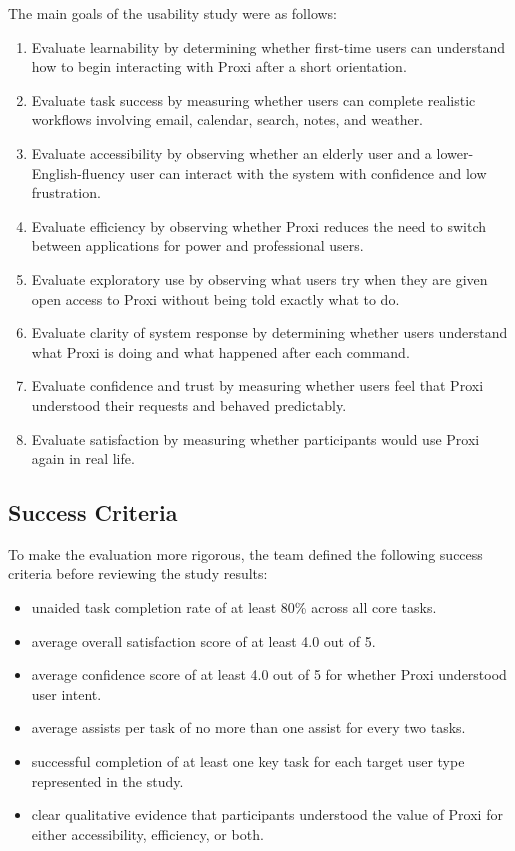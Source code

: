 \documentclass[12pt, titlepage]{article}
\begin{document}
The main goals of the usability study were as follows:
\begin{enumerate}[label=\arabic*.]
    \item Evaluate learnability by determining whether first-time users
    can understand how to begin interacting with Proxi after a short
    orientation.
    \item Evaluate task success by measuring whether users can complete
    realistic workflows involving email, calendar, search, notes, and
    weather.
    \item Evaluate accessibility by observing whether an elderly user
    and a lower-English-fluency user can interact with the system with
    confidence and low frustration.
    \item Evaluate efficiency by observing whether Proxi reduces the
    need to switch between applications for power and professional
    users.
    \item Evaluate exploratory use by observing what users try when they
    are given open access to Proxi without being told exactly what to
    do.
    \item Evaluate clarity of system response by determining whether
    users understand what Proxi is doing and what happened after each
    command.
    \item Evaluate confidence and trust by measuring whether users feel
    that Proxi understood their requests and behaved predictably.
    \item Evaluate satisfaction by measuring whether participants would
    use Proxi again in real life.
\end{enumerate}

\subsection{Success Criteria}

To make the evaluation more rigorous, the team defined the following
success criteria before reviewing the study results:

\begin{itemize}
    \item unaided task completion rate of at least 80\% across all core
    tasks.
    \item average overall satisfaction score of at least 4.0 out of 5.
    \item average confidence score of at least 4.0 out of 5 for whether
    Proxi understood user intent.
    \item average assists per task of no more than one assist for every
    two tasks.
    \item successful completion of at least one key task for each target
    user type represented in the study.
    \item clear qualitative evidence that participants understood the
    value of Proxi for either accessibility, efficiency, or both.
\end{itemize}
\end{document}
